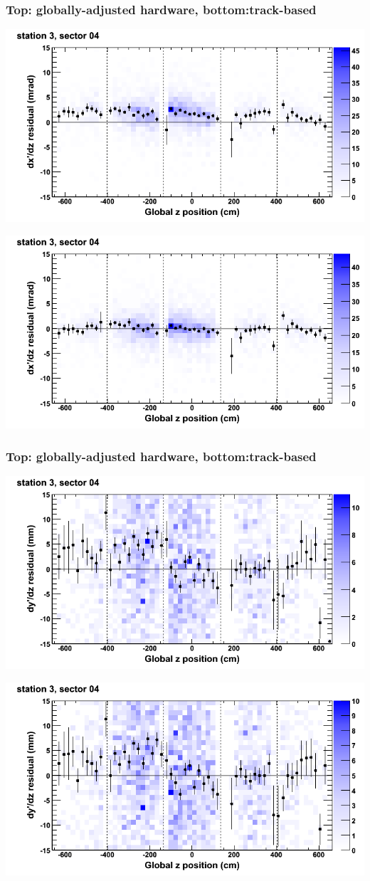 \documentclass[compress]{beamer}
\begin{document}
\begin{frame}
\frametitle{Top: globally-adjusted hardware, bottom:track-based}
\includegraphics[width=0.7\linewidth]{NOV4_mapplots_HW/DTvsz_st3sec04_dxdz.png}

\includegraphics[width=0.7\linewidth]{NOV4_mapplots/DTvsz_st3sec04_dxdz.png}
\end{frame}

\begin{frame}
\frametitle{Top: globally-adjusted hardware, bottom:track-based}
\includegraphics[width=0.7\linewidth]{NOV4_mapplots_HW/DTvsz_st3sec04_dydz.png}

\includegraphics[width=0.7\linewidth]{NOV4_mapplots/DTvsz_st3sec04_dydz.png}
\end{frame}
\end{document}
